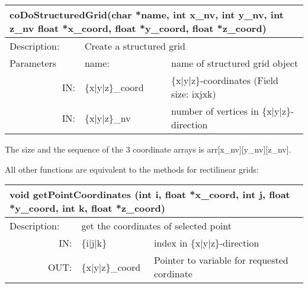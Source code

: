 \begin{htmlonly}
\begin{longtable}{|p{4cm}|p{2.5cm}|p{7cm}|}
\hline
\multicolumn{3}{|p{13.5cm}|}{\bf coDoStructuredGrid(char *name, int x\_nv, int y\_nv, int z\_nv \newline 
         float *x\_coord, float *y\_coord, float *z\_coord)}\\
\hline
{Description:}  
           & \multicolumn{2}{p{9.5cm}|}{Create a structured grid} \\
\hline
{Parameters} & \multicolumn{1}{p{3cm}|}{name:} 
                          & \multicolumn{1}{p{5cm}|}{name of structured grid object}\\
\hline
\multicolumn{1}{|r|}{IN:} & \multicolumn{1}{p{3cm}|}{\{x|y|z\}\_coord} 
                          & \multicolumn{1}{p{5cm}|}{\{x|y|z\}-coordinates
			   (Field size: ixjxk)}\\
\hline
\multicolumn{1}{|r|}{IN:} & \multicolumn{1}{p{3cm}|}{\{x|y|z\}\_nv} 
                          & \multicolumn{1}{p{5cm}|}{number of vertices in
			  \{x|y|z\}-direction}\endhead
\hline
\end{longtable}
\end{htmlonly}

The size and the sequence of the 3 coordinate arrays is arr[x\_nv][y\_nv][z\_nv].

All other functions are equivalent to the methods for rectilinear grids:

\latexonly
\begin{longtable}{|p{4cm}|p{2.5cm}|p{7cm}|}
\hline
\multicolumn{3}{|p{13.5cm}|}{\bf void getPointCoordinates \newline
(int i, float *x\_coord, int j,  float *y\_coord,  int k, float *z\_coord)}\\
\hline
{Description:}  
           & \multicolumn{2}{p{9.5cm}|}{get the coordinates of selected point} \\
\hline
\multicolumn{1}{|r|}{IN:} & \multicolumn{1}{p{3cm}|}{\{i$\mid$j$\mid$k\}} 
                          & \multicolumn{1}{p{5cm}|}{index in 
			     \{x$\mid$y$\mid$z\}-direction}\\
\hline
\multicolumn{1}{|r|}{OUT:} & \multicolumn{1}{p{3cm}|}{\{x$\mid$y$\mid$z\}\_coord} 
                          & \multicolumn{1}{p{5cm}|}{Pointer to variable
			  for requested cordinate}\endhead
\hline
\end{longtable}
\endlatexonly

